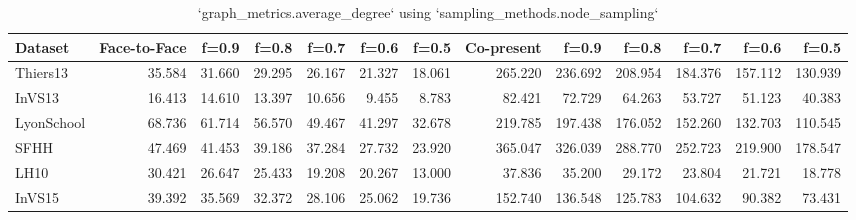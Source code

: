 \begin{table}[ht]
\begin{tabular}{lrrrrrrrrrrrr}
\hline
 Dataset    &   Face-to-Face &   f=0.9 &   f=0.8 &   f=0.7 &   f=0.6 &   f=0.5 &   Co-present &   f=0.9 &   f=0.8 &   f=0.7 &   f=0.6 &   f=0.5 \\
\hline
 Thiers13   &         35.584 &  31.660 &  29.295 &  26.167 &  21.327 &  18.061 &      265.220 & 236.692 & 208.954 & 184.376 & 157.112 & 130.939 \\
 InVS13     &         16.413 &  14.610 &  13.397 &  10.656 &   9.455 &   8.783 &       82.421 &  72.729 &  64.263 &  53.727 &  51.123 &  40.383 \\
 LyonSchool &         68.736 &  61.714 &  56.570 &  49.467 &  41.297 &  32.678 &      219.785 & 197.438 & 176.052 & 152.260 & 132.703 & 110.545 \\
 SFHH       &         47.469 &  41.453 &  39.186 &  37.284 &  27.732 &  23.920 &      365.047 & 326.039 & 288.770 & 252.723 & 219.900 & 178.547 \\
 LH10       &         30.421 &  26.647 &  25.433 &  19.208 &  20.267 &  13.000 &       37.836 &  35.200 &  29.172 &  23.804 &  21.721 &  18.778 \\
 InVS15     &         39.392 &  35.569 &  32.372 &  28.106 &  25.062 &  19.736 &      152.740 & 136.548 & 125.783 & 104.632 &  90.382 &  73.431 \\
\hline
\end{tabular}
\caption{`graph_metrics.average_degree` using `sampling_methods.node_sampling`}
\end{table}
